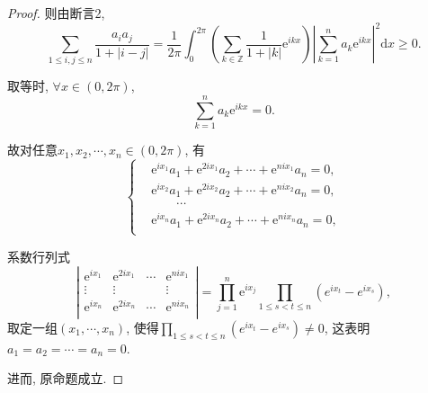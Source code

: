 \documentclass[lang=cn,12pt,a4paper]{elegantpaper.cls}
\begin{document}
\begin{enumerate}
\begin{proof}
		则由断言2,\[\sum_{1\leq i,j\leq n}\dfrac{a_ia_j}{1+|i-j|}=\dfrac{1}{2\pi}\int_{0}^{2\pi}\left(\sum_{k\in\mathbb Z}\dfrac{1}{1+|k|}\mathrm e^{ikx}\right)\left|\sum_{k=1}^{n}a_k\mathrm e^{ikx}\right|^2\mathrm dx\geq 0.\]
		
		取等时, $\forall x\in (0,2\pi)$, \[\sum_{k=1}^{n}a_k\mathrm e^{ikx}=0.\] 	
		
		故对任意$x_1,x_2,\cdots,x_n\in(0,2\pi)$, 有\[\left\{\begin{aligned}
			&\mathrm e^{ix_1}a_1+\mathrm e^{2ix_1}a_2+\cdots+\mathrm e^{nix_1}a_n=0,\\
			&\mathrm e^{ix_2}a_1+\mathrm e^{2ix_2}a_2+\cdots+\mathrm e^{nix_2}a_n=0,\\
			&\qquad\cdots\\
			&\mathrm e^{ix_n}a_1+\mathrm e^{2ix_n}a_2+\cdots+\mathrm e^{nix_n}a_n=0,\\
		\end{aligned}\right.\]
		
		系数行列式\[\left|\begin{matrix}
			\mathrm e^{ix_1}& \mathrm e^{2ix_1} & \cdots & \mathrm e^{nix_1}\\
			\vdots & \vdots &  & \vdots\\
			\mathrm e^{ix_n} & \mathrm e^{2ix_n} & \cdots & \mathrm e^{nix_n}\\
		\end{matrix}\right|=\prod_{j=1}^{n}\mathrm e^{ix_j}\prod_{1\leq s<t\leq n}(e^{ix_t}-e^{ix_s}),\]取定一组$(x_1,\cdots,x_n)$, 使得$\prod\limits_{1\leq s<t\leq n}(e^{ix_t}-e^{ix_s})\neq 0$, 这表明$a_1=a_2=\cdots=a_n=0$.
		
		进而, 原命题成立.
		
		
	\end{proof}
	

\end{enumerate}
\end{document}
